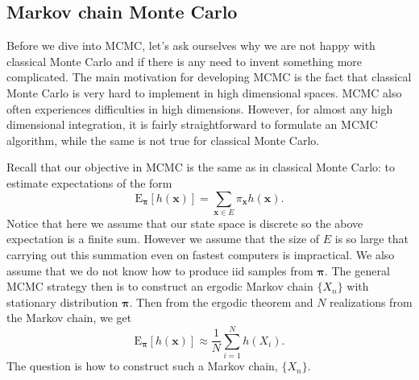 \documentclass[11pt]{article}\usepackage[]{graphicx}\usepackage[]{color}
\numberwithin{algorithm}{section}
\theoremstyle{remark}
\theoremstyle{definition}
\begin{document}
\subsection{Markov chain Monte Carlo}
Before we dive into MCMC, let's ask ourselves why we are not happy with classical Monte Carlo and if there is 
any need to invent something more complicated. The main motivation for developing MCMC is the fact 
that classical Monte Carlo is very hard to implement in high dimensional spaces. MCMC also often 
experiences difficulties in high dimensions. However, for almost any high dimensional integration, it is fairly
straightforward to formulate an MCMC algorithm, while the same is not true for classical Monte Carlo.
\par
Recall that our objective in MCMC is the same as in classical Monte Carlo: to estimate expectations of 
the form
\begin{equation*}
  \text{E}_{\boldsymbol{\pi}}[h(\mathbf{x})] = \sum_{\boldsymbol{x} \in E} \pi_{\boldsymbol{x}} h(\mathbf{x}).
\end{equation*}
Notice that here we assume that our state space is discrete so the above expectation is a finite sum.
However we assume that the size of $E$ is so large that carrying out this summation even on fastest computers
is impractical. We also assume that we do not know how to produce iid samples from $\boldsymbol{\pi}$.
The general MCMC strategy then is to construct an ergodic Markov chain $\{X_n\}$
with stationary distribution $\boldsymbol{\pi}$. Then from the ergodic theorem and $N$ realizations from
the Markov chain, we get
\begin{equation*}
  \text{E}_{\boldsymbol{\pi}}[h(\mathbf{x})] \approx \frac{1}{N} \sum_{i = 1}^N h(X_i).
\end{equation*}
The question is how to construct such a Markov chain, $\{X_n\}$.
\end{document}
